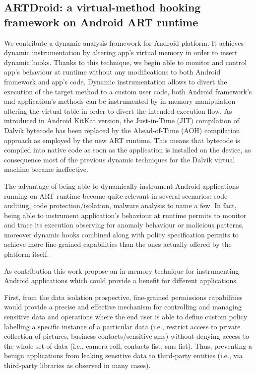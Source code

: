 \subsection{ARTDroid: a virtual-method hooking framework on Android ART runtime}

We contribute a dynamic analysis framework for Android platform. It achieves dynamic instrumentation by altering app's virtual memory in order to insert dynamic hooks. Thanks to this technique, we begin able to monitor and control app's behaviour at runtime without any modifications to both Android framework and app's code. Dynamic instrumentation allows to divert the execution of the target method to a custom user code, both Android framework's and application's methods can be instrumented by in-memory manipulation altering the virtual-table in order to divert the intended execution flow. As introduced in Android KitKat version, the Just-in-Time (JIT) compilation of Dalvik bytecode has been replaced by the Ahead-of-Time (AOH) compilation approach as employed by the new ART runtime. This means that bytecode is compiled into native code as soon as the application is installed on the device, as consequence most of the previous dynamic techniques for the Dalvik virtual machine became ineffective.

The advantage of being able to dynamically instrument Android applications running on ART runtime become quite relevant in several scenarios: code auditing, code protection/isolation, malware analysis to name a few. In fact, being able to instrument application's behaviour at runtime permits to monitor and trace its execution observing for anomaly behaviour or malicious patterns, moreover dynamic hooks combined along with policy specification permits to achieve more fine-grained capabilities  than the ones actually offered by the platform itself.

As contribution this work propose an in-memory technique for instrumenting Android applications which could provide a benefit for different applications.

First, from the data isolation prospective, fine-grained permissions capabilities would provide a precise and effective mechanism for controlling and managing sensitive data and operations where the end user is able to define custom policy labelling a specific instance of a particular data (i.e., restrict access to private collection of pictures, business contacts/sensitive sms) without denying access to the whole set of data (i.e., camera roll, contacts list, sms list). Thus, preventing a benign applications from leaking sensitive data to third-party entities (i.e., via third-party libraries as observed in many cases).

